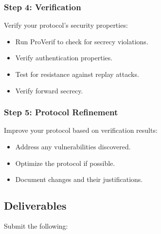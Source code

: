 \documentclass[10pt,a4paper,american]{article}
\begin{document}
\subsubsection*{Step 4: Verification}
Verify your protocol's security properties:
\begin{itemize}
	\item Run ProVerif to check for secrecy violations.
	\item Verify authentication properties.
	\item Test for resistance against replay attacks.
	\item Verify forward secrecy.
\end{itemize}

\subsubsection*{Step 5: Protocol Refinement}
Improve your protocol based on verification results:
\begin{itemize}
	\item Address any vulnerabilities discovered.
	\item Optimize the protocol if possible.
	\item Document changes and their justifications.
\end{itemize}

\subsection*{Deliverables}
Submit the following:
\end{document}
